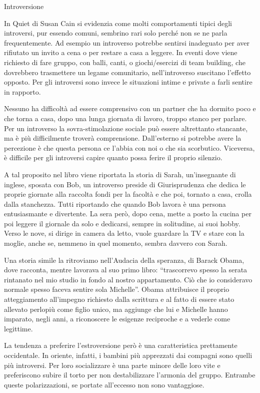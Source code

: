 \documentclass[12pt]{book} %
\begin{document}
\begin{mdframed}[linewidth=1pt]
Introversione

In Quiet di Susan Cain si evidenzia come molti comportamenti tipici degli introversi, pur essendo comuni, sembrino rari solo perché non se ne parla frequentemente. Ad esempio un introverso potrebbe sentirsi inadeguato per aver rifiutato un invito a cena o per restare a casa a leggere. In eventi dove
viene richiesto di fare gruppo, con balli, canti, o giochi/esercizi di team building, che dovrebbero trasmettere un
legame comunitario, nell'introverso suscitano l'effetto opposto. Per gli
introversi sono invece le situazioni intime e private a farli sentire in rapporto.

Nessuno ha difficoltà ad essere comprensivo con un partner che ha dormito poco e che torna a casa, dopo una lunga
giornata di lavoro, troppo stanco per parlare. Per un introverso la sovra-stimolazione sociale può essere altrettanto
stancante, ma è più difficilmente troverà comprensione. Dall'esterno si potrebbe avere la percezione è che questa persona ce
l'abbia con noi o che sia scorbutico. Viceversa, è difficile per gli introversi capire quanto possa ferire il proprio silenzio. 

A tal proposito nel libro viene riportata la storia di Sarah, un'insegnante di inglese, sposata con Bob, un introverso
preside di Giurisprudenza che dedica le proprie giornate alla raccolta fondi per la facoltà e che poi, tornato a casa,
crolla dalla stanchezza. Tutti riportando che quando Bob lavora è una
persona entusiasmante e divertente. La sera però, dopo cena, mette a posto la cucina per poi leggere il giornale da solo e
dedicarsi, sempre in solitudine, ai suoi hobby. Verso le nove, si dirige in camera da letto, vuole
guardare la TV e stare con la moglie, anche se, nemmeno in quel momento, sembra davvero con Sarah.

Una storia simile la ritroviamo nell'Audacia della speranza, di Barack Obama, dove racconta, mentre lavorava al suo primo libro: 
“trascorrevo spesso la serata rintanato nel mio studio in fondo al nostro
appartamento. Ciò che io consideravo normale spesso faceva sentire sola Michelle”. Obama attribuisce il proprio
atteggiamento all'impegno richiesto dalla scrittura e al fatto di essere stato allevato perlopiù come figlio unico, ma
aggiunge che lui e Michelle hanno imparato, negli anni, a riconoscere le esigenze reciproche e a vederle come legittime. 

La tendenza a preferire l'estroversione però è una caratteristica prettamente occidentale. In
oriente, infatti, i bambini più apprezzati dai compagni sono quelli più introversi. Per loro socializzare è una parte
minore delle loro vite e preferiscono subire il torto per non destabilizzare l'armonia del gruppo. Entrambe queste
polarizzazioni, se portate all'eccesso non sono vantaggiose.


\end{mdframed}
\end{document}
